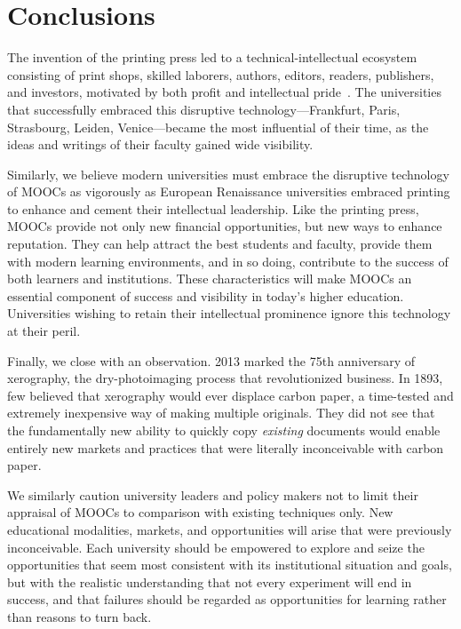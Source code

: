 \section{Conclusions}




The invention of the printing press led to a
technical-intellectual ecosystem consisting of print shops, skilled
laborers, authors, editors, readers, publishers, and investors,
motivated by both profit and intellectual pride~\cite{febvre}.
The universities that successfully embraced this disruptive
technology---Frankfurt, Paris, 
Strasbourg, Leiden, Venice---became the most influential of their
time, as the ideas and writings of their faculty gained wide visibility.

Similarly, we believe modern universities must embrace the disruptive
technology of MOOCs as vigorously as European Renaissance universities
embraced printing to enhance and cement their
intellectual leadership.
Like the printing press, MOOCs provide not only new financial
opportunities,
but new ways to enhance reputation.
They can help attract the best students and
faculty, provide them with modern learning environments, and in so doing,
contribute to the success of both learners and institutions.
These characteristics will make MOOCs an
essential component of success and visibility in today's higher
education. 
Universities wishing to retain their intellectual
prominence ignore this technology at their peril.

Finally, we close with an observation.
2013 marked the 75th anniversary of xerography, the dry-photoimaging
process that revolutionized business.
In 1893, few believed that xerography would ever displace carbon
paper, a time-tested and extremely inexpensive way of making multiple
originals.  They did not see that the fundamentally new ability to
quickly copy \emph{existing} documents would enable entirely new markets
and practices that were literally inconceivable with carbon paper.

We similarly caution university leaders and policy makers not to limit
their appraisal of MOOCs to comparison with existing techniques only.
New educational modalities, markets, and opportunities will arise that
were previously inconceivable.  Each university should be empowered to
explore and seize the opportunities that seem most consistent with its
institutional situation and goals, but with the realistic understanding that
not every experiment will end in success, and that failures should be
regarded as
opportunities for learning rather than reasons to turn back.





